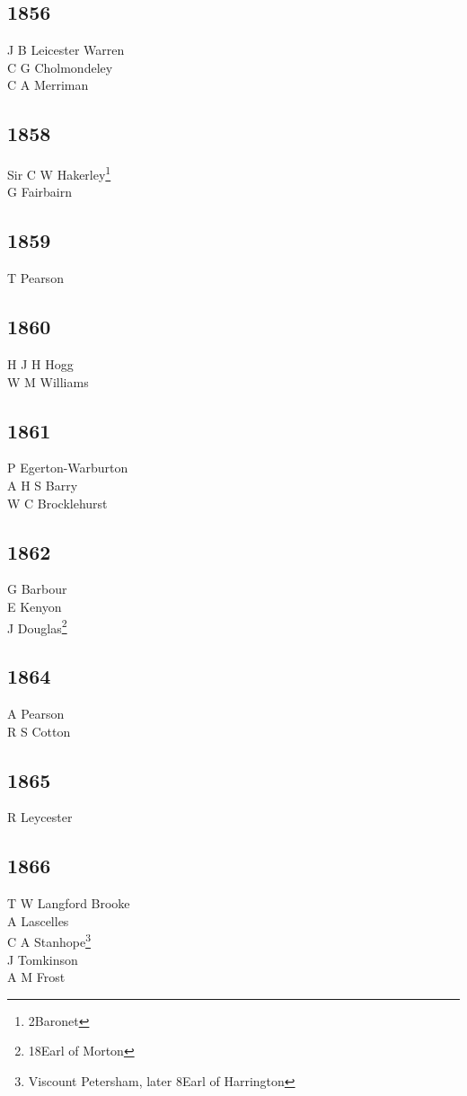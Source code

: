 \begin{multicols}{3}
  \subsection*{1856}
  J B Leicester Warren \\
  C G Cholmondeley \\
  C A Merriman \\
  \subsection*{1858}
  Sir C W Hakerley\footnote{2\nd Baronet} \\
  G Fairbairn \\
  \subsection*{1859}
  T Pearson \\
  \subsection*{1860}
  H J H Hogg \\
  W M Williams \\
  \subsection*{1861}
  P Egerton-Warburton \\
  A H S Barry \\
  W C Brocklehurst \\
  \subsection*{1862}
  G Barbour \\
  E Kenyon \\
  J Douglas\footnote{18\nth Earl of Morton} \\
  \subsection*{1864}
  A Pearson \\
  R S Cotton \\
  \subsection*{1865}
  R Leycester \\
  \subsection*{1866}
  T W Langford Brooke \\
  A Lascelles \\
  C A Stanhope\footnote{Viscount Petersham, later 8\nth Earl of Harrington} \\
  J Tomkinson \\
  A M Frost \\

\end{multicols}

